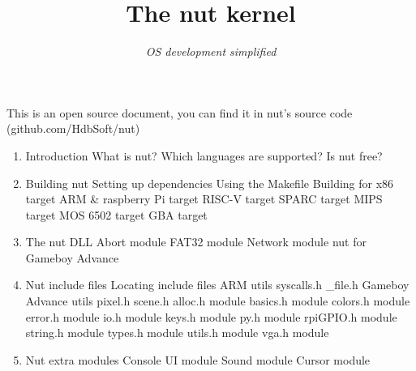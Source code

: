 \documentclass{article}
\title{The nut kernel}
\author{\textit{OS development simplified}}
\date{}
\begin{document}
  \maketitle
  \newpage
  \begin{center}
    This is an open source document, you can find it in nut's source code (github.com/HdbSoft/nut)
  \end{center}
  \newpage

  \begin{enumerate}
  	\Large \item Introduction
    \large \subitem What is nut?
    \large \subitem Which languages are supported?
    \large \subitem Is nut free?
  	\\
  	\Large \item Building nut
    \large \subitem Setting up dependencies
    \large \subitem Using the Makefile
  	\large \subitem Building for x86 target
  	\large \subitem ARM \& raspberry Pi target
  	\large \subitem RISC-V target
  	\large \subitem SPARC target
  	\large \subitem MIPS target
  	\large \subitem MOS 6502 target
  	\large \subitem GBA target
    \\
  	\Large \item The nut DLL
  	\large \subitem Abort module
    \large \subitem FAT32 module
    \large \subitem Network module
    \large \subitem nut for Gameboy Advance
    \\
  	\Large \item Nut include files
    \large \subitem Locating include files
    \large \subitem ARM utils
    \normalsize \subitem \hspace{1cm} syscalls.h
    \normalsize \subitem \hspace{1cm} \_file.h
    \large \subitem Gameboy Advance utils
    \normalsize \subitem \hspace{1cm} pixel.h
    \normalsize \subitem \hspace{1cm} scene.h
    \large \subitem alloc.h module
    \large \subitem basics.h module
    \large \subitem colors.h module
    \large \subitem error.h module
    \large \subitem io.h module
    \large \subitem keys.h module
    \large \subitem py.h module
    \large \subitem rpiGPIO.h module
    \large \subitem string.h module
    \large \subitem types.h module
    \large \subitem utils.h module
    \large \subitem vga.h module
    \\
    \Large \item Nut extra modules
    \large \subitem Console UI module
    \large \subitem Sound module
    \large \subitem Cursor module

\end{enumerate}
\end{document}
